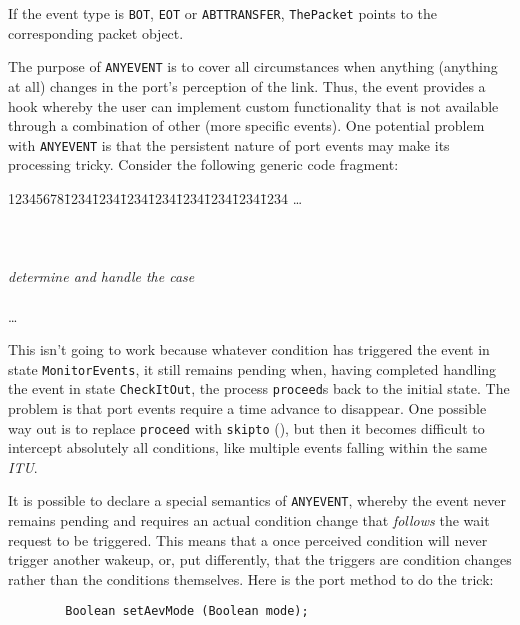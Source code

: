 \bigskip

If the event type is {\tt BOT}, {\tt EOT} or
{\tt ABTTRANSFER}, {\tt ThePacket} points to
the corresponding packet object.

The purpose of {\tt ANYEVENT} is to cover all circumstances when anything
(anything at all) changes in the port's perception of the link.
Thus, the event provides a hook whereby the user can implement custom
functionality that is not available through a combination of other
(more specific events).
One potential problem with {\tt ANYEVENT} is that the persistent nature of
port events may make its processing tricky.
Consider the following generic code fragment:

{\tt\begin{tabbing}
12345678\=1234\=1234\=1234\=1234\=1234\=1234\=1234\=1234\kill
\>\ldots \\
 \\
\> \\
 \\
\>\> {\em determine and handle the case} \\
\>  \\
\> \ldots \\
\end{tabbing}}

\noindent
This isn't going to work because whatever condition has triggered the event
in state {\tt MonitorEvents}, it still remains pending when, having completed
handling the event in state {\tt CheckItOut},
the process {\tt proceed}s back to the initial state.
The problem is that port events require a time advance to disappear.
One possible way out is to replace {\tt proceed} with {\tt skipto}
(), but then it becomes difficult to intercept absolutely all
conditions, like multiple events falling within the same {\em ITU}.

It is possible to declare a special semantics of {\tt ANYEVENT}, whereby
the event never remains pending and requires an actual condition change that
{\em follows\/} the wait request to be triggered.
This means that a once perceived condition will never trigger another
wakeup, or, put differently, that the triggers are condition changes
rather than the conditions themselves.
Here is the port method to do the trick:

\begin{verbatim}
        Boolean setAevMode (Boolean mode);
\end{verbatim}

